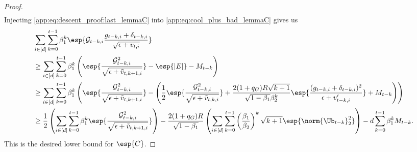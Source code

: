 \documentclass[11pt, letterpaper]{article}
\begin{document}
\begin{proof}
\begin{align}
\end{align}
Injecting \eqref{app:eq:descent_proof:last_lemmaC} into \eqref{app:eq:cool_plus_bad_lemmaC} gives us 
\begin{align}
\nonumber
    &\sum_{i\in [d]}\sum_{k=0}^{t-1}\beta_1^k \esp{\mathcal{G}_{t -k, i} \frac{g_{t-k,i}+\delta_{t-k,i}}{\sqrt{\epsilon+v_{t, i}}}} \\
    &\geq \sum_{i\in [d]}\sum_{k=0}^{t-1}\beta_1^k \left(\esp{\frac{\mathcal{G}_{t - k, i}^2}{\sqrt{\epsilon+\tilde{v}_{t, k+1, i}}}} - \esp{|E|} - M_{t-k} \right)\\
    \nonumber
    &\geq \sum_{i\in [d]}\sum_{k=0}^{t-1}\beta_1^k \left(\esp{\frac{\mathcal{G}_{t - k, i}^2}{\sqrt{\epsilon+\tilde{v}_{t, k+1, i}}}} - \left( \frac{1}{2}\esp{\frac{\mathcal{G}_{t - k, i}^2}{\sqrt{\epsilon+\tilde{v}_{t, k, i}}}} + \frac{2 (1+q_G)R\sqrt{k+1}}{\sqrt{1 - \beta_1}\beta_2^k} \esp{\frac{(g_{t -k, i}+\delta_{t-k,i})^2}{\epsilon + v'_{t - k, i}}} + M_{t-k} \right)\right) \\
    & \geq \frac{1}{2}\left(\sum_{i\in [d]} \sum_{k=0}^{t-1}\beta_1^k\esp{\frac{\mathcal{G}_{t - k, i}^2}{\sqrt{\epsilon+\tilde{v}_{t, k+1, i}}}}\right) -
    \frac{2 (1+q_G)R}{\sqrt{1 - \beta_1}}\left(\sum_{i\in [d]} \sum_{k=0}^{t-1}
     \left(\frac{\beta_1}{\beta_2}\right)^k \sqrt{k+1} \esp{\norm{\Ub_{t -k}}_2^2}\right)-d\sum_{k=0}^{t-1}\beta_1^kM_{t-k}.
\end{align}
This is the desired lower bound for $\esp{C}$.
\end{proof}
\end{document}
